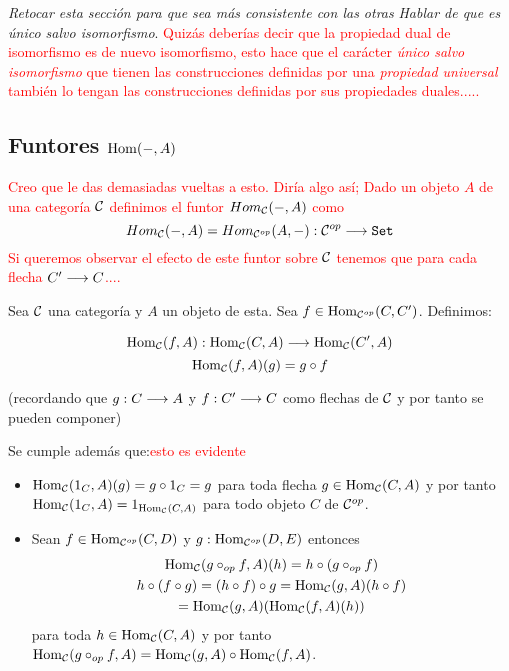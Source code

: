\textit{Retocar esta sección para que sea más consistente con las otras}
\textit{Hablar de que es único salvo isomorfismo}. \textcolor{red}{Quizás deberías decir que la propiedad dual de isomorfismo es de nuevo isomorfismo, esto hace que el carácter \emph{único salvo isomorfismo} que tienen las construcciones definidas por  una \emph{propiedad universal} también lo tengan las construcciones definidas por sus propiedades duales.....}


\subsection{Funtores $\operatorname{Hom}(-, A)$}
\textcolor{red}{Creo que le das demasiadas vueltas a esto. Diría algo así; Dado un objeto $A$ de una categoría $\mathcal{C}$ definimos el funtor $Hom_{\mathcal{C}}(-,A)$ como $$Hom_{\mathcal{C}}(-,A)=Hom_{\mathcal{C}^{op}}(A,-):\mathcal{C}^{op}\longrightarrow \texttt{Set}$$ Si queremos observar el efecto de este funtor sobre $\mathcal{C}$ tenemos que para cada flecha $C'\longrightarrow C$....}



Sea $\mathcal{C}$ una categoría y $A$ un objeto de esta.
Sea $f \in \operatorname{Hom}_{\mathcal{C}^{op}}(C, C')$. Definimos:

$$\Hom_{\C}(f, A) :
  \arr{
    \Hom_{\C}(C, A)
  }{
    \Hom_{\C}(C', A)
  }$$
$$\operatorname{Hom}_{\mathcal{C}}(f, A)(g) = g \circ f$$

(recordando que $g : C\longrightarrow A$ y $f : C'\longrightarrow C$ como
flechas de $\mathcal{C}$ y por tanto se pueden componer)

Se cumple además que:\textcolor{red}{esto es evidente}

\begin{itemize}
\item $\operatorname{Hom}_{\mathcal{C}}(1_C, A)(g) = g \circ 1_C = g$ para toda flecha
  $g\in \operatorname{Hom}_{\mathcal{C}}(C, A)$ y por tanto
  $\operatorname{Hom}_{\mathcal{C}}(1_C, A) = 1_{\operatorname{Hom}_{\mathcal{C}}(C, A)}$ para todo objeto $C$
  de $\mathcal{C}^{op}$.

\item Sean $f \in \operatorname{Hom}_{\mathcal{C}^{op}}(C, D)$ y $g : \operatorname{Hom}_{\mathcal{C}^{op}}(D, E)$
  entonces
  \begin{multline*}
    $$\Hom_{\C}(g \circ_{op} f, A)(h) = h \circ (g \circ_{op} f) \\
      h \circ (f \circ g) = (h \circ f) \circ g = \Hom_{\C}(g, A)(h \circ f) \\
      = \Hom_{\C}(g, A)(\Hom_{\C}(f, A)(h))$$
  \end{multline*}
  para toda $h \in \operatorname{Hom}_{\mathcal{C}}(C, A)$ y por tanto
  $\operatorname{Hom}_{\mathcal{C}}(g \circ_{op} f, A) = \operatorname{Hom}_{\mathcal{C}}(g, A) \circ \operatorname{Hom}_{\mathcal{C}}(f, A)$.
\end{itemize}

